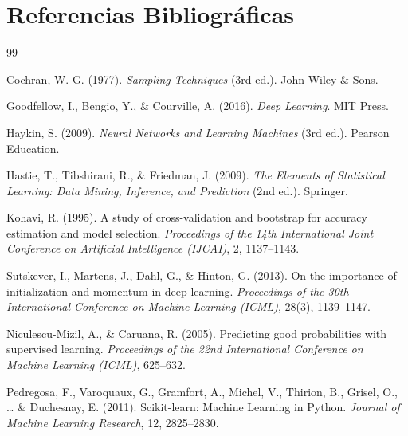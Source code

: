 \documentclass[11pt,a4paper]{article}
\begin{document}
\section{Referencias Bibliográficas}

\begin{thebibliography}{99}

Cochran, W. G. (1977). \textit{Sampling Techniques} (3rd ed.). John Wiley \& Sons.

Goodfellow, I., Bengio, Y., \& Courville, A. (2016). \textit{Deep Learning}. MIT Press.

Haykin, S. (2009). \textit{Neural Networks and Learning Machines} (3rd ed.). Pearson Education.

Hastie, T., Tibshirani, R., \& Friedman, J. (2009). \textit{The Elements of Statistical Learning: Data Mining, Inference, and Prediction} (2nd ed.). Springer.

Kohavi, R. (1995). A study of cross-validation and bootstrap for accuracy estimation and model selection. \textit{Proceedings of the 14th International Joint Conference on Artificial Intelligence (IJCAI)}, 2, 1137--1143.

Sutskever, I., Martens, J., Dahl, G., \& Hinton, G. (2013). On the importance of initialization and momentum in deep learning. \textit{Proceedings of the 30th International Conference on Machine Learning (ICML)}, 28(3), 1139--1147.

Niculescu-Mizil, A., \& Caruana, R. (2005). Predicting good probabilities with supervised learning. \textit{Proceedings of the 22nd International Conference on Machine Learning (ICML)}, 625--632.

Pedregosa, F., Varoquaux, G., Gramfort, A., Michel, V., Thirion, B., Grisel, O., \dots{} \& Duchesnay, E. (2011). Scikit-learn: Machine Learning in Python. \textit{Journal of Machine Learning Research}, 12, 2825--2830.

\end{thebibliography}
\end{document}
